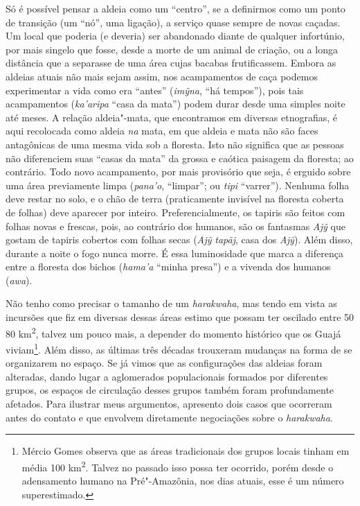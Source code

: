 Só é possível pensar a aldeia como um ``centro'', se a definirmos como um
ponto de transição (um ``nó'', uma ligação), a serviço quase sempre de
novas caçadas. Um local que poderia (e deveria) ser abandonado diante de
qualquer infortúnio, por mais singelo que fosse, desde a morte de um
animal de criação, ou a longa distância que a separasse de uma área
cujas bacabas frutificassem. Embora as aldeias atuais não mais sejam
assim, nos acampamentos de caça podemos experimentar a vida como era
``antes'' (\emph{imỹna}, ``há tempos''), pois tais acampamentos
(\emph{ka'aripa} ``casa da mata'') podem durar desde uma simples noite até
meses. A relação aldeia"-mata, que encontramos em diversas etnografias, é
aqui recolocada como aldeia \emph{na} mata, em que aldeia e mata não são
faces antagônicas de uma mesma vida sob a floresta. Isto não significa
que as pessoas não diferenciem suas ``casas da mata'' da grossa e caótica
paisagem da floresta; ao contrário. Todo novo acampamento, por mais
provisório que seja, é erguido sobre uma área previamente limpa
(\emph{pana'o}, ``limpar''; ou \emph{tipi} ``varrer''). Nenhuma folha deve
restar no solo, e o chão de terra (praticamente invisível na floresta
coberta de folhas) deve aparecer por inteiro. Preferencialmente, os
tapiris são feitos com folhas novas e frescas, pois, ao contrário dos
humanos, são os fantasmas \emph{Ajỹ} que gostam de tapiris cobertos com
folhas secas (\emph{Ajỹ} \emph{tapãj}, casa dos \emph{Ajỹ}). Além
disso, durante a noite o fogo nunca morre. É essa luminosidade que marca
a diferença entre a floresta dos bichos (\emph{hama'a} ``minha presa'') e
a vivenda dos humanos (\emph{awa}).

Não tenho como precisar o tamanho de um \emph{harakwaha}, mas tendo em
vista as incursões que fiz em diversas dessas áreas estimo que possam
ter oscilado entre 50 \emph{} 80 km\textsuperscript{2}, talvez um pouco mais,
a depender do momento histórico que os Guajá viviam\footnote{Mércio
  Gomes observa que as áreas tradicionais dos grupos locais tinham em
  média 100 km\textsuperscript{2}. Talvez no passado isso possa ter
  ocorrido, porém desde o adensamento humano na Pré"-Amazônia, nos dias
  atuais, esse é um número superestimado.}. Além disso, as últimas três
décadas trouxeram mudanças na forma de se organizarem no espaço. Se já
vimos que as configurações das aldeias foram alteradas, dando lugar a
aglomerados populacionais formados por diferentes grupos, os espaços de
circulação desses grupos também foram profundamente afetados. Para
ilustrar meus argumentos, apresento dois casos que ocorreram antes do
contato e que envolvem diretamente negociações sobre o \emph{harakwaha}.


